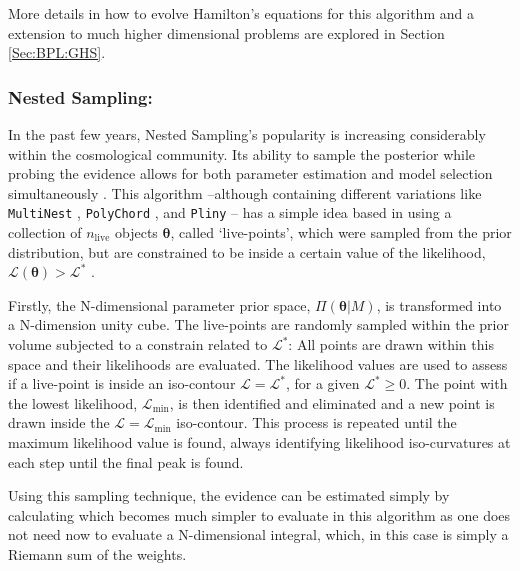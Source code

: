 \qquad More details in how to evolve Hamilton's equations for this algorithm and a extension to much higher dimensional problems are explored in Section \ref{Sec:BPL:GHS}.

\subsubsection{Nested Sampling:}
In the past few years, Nested Sampling's popularity is increasing considerably within the cosmological community. Its ability to sample the posterior while probing the evidence allows for both parameter estimation and model selection simultaneously \citep{2004NestedSampling}. This algorithm --although containing different variations like \texttt{MultiNest} \citep{2009Multinest}, \texttt{PolyChord} \citep{2015PolyChord}, and \texttt{Pliny} \citep{PlinyRichardThesis} -- has a simple idea based in using a collection of $n_{\text{live}}$ objects $\bm{\theta}$, called `live-points', which were sampled from the prior distribution, but are constrained to be inside a certain value of the likelihood, $\mathcal{L}(\bm{\theta}) > \mathcal{L}^*$ \citep{sivia2006data}.

\qquad Firstly, the N-dimensional parameter prior space, $\Pi(\bm{\theta}|M)$, is transformed into a N-dimension unity cube. The live-points are randomly sampled within the prior volume subjected to a constrain related to $\mathcal{L}^*$:
All points are drawn within this space and their likelihoods are evaluated. The likelihood values are used to assess if a live-point is inside an iso-contour $\mathcal{L} = \mathcal{L}^*$, for a given $\mathcal{L}^*\geq 0$. The point with the lowest likelihood, $\mathcal{L}_{\min}$, is then identified and eliminated and a new point is drawn inside the $\mathcal{L} = \mathcal{L}_{\min}$ iso-contour. This process is repeated until the maximum likelihood value is found, always identifying likelihood iso-curvatures at each step until the final peak is found.

\qquad Using this sampling technique, the evidence can be estimated simply by calculating
which becomes much simpler to evaluate in this algorithm as one does not need now to evaluate a N-dimensional integral, which, in this case is simply a Riemann sum of the weights.

